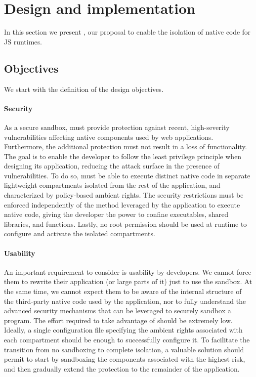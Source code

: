 \section{Design and implementation}
\label{sect:design-and-implementation}

In this section we present \natisand, our proposal to enable the isolation
of native code for JS runtimes.

\subsection{Objectives}
\label{subsect:objectives}

We start with the definition of the design objectives.

\paragraph{Security}
As a secure sandbox, \natisand must provide protection against recent,
high-severity vulnerabilities affecting native components used by web
applications. Furthermore, the additional protection must not result
in a loss of functionality. The goal is to enable the developer to
follow the least privilege principle when designing its application,
reducing the attack surface in the presence of vulnerabilities.  To do
so, \natisand must be able to execute distinct native code in separate lightweight
compartments isolated from the rest of the application, and
characterized by policy-based ambient rights. The security
restrictions must be enforced independently of the method leveraged by
the application to execute native code, giving the developer the power
to confine executables, shared libraries, and functions. Lastly, no
root permission should be used at runtime to configure and activate
the isolated compartments.

\paragraph{Usability}
An important requirement to consider is usability by developers.  We
cannot force them to rewrite their application (or large parts of it)
just to use the sandbox. At the same time, we cannot expect them to be
aware of the internal structure of the third-party native code used by
the application, nor to fully understand the advanced security
mechanisms that can be leveraged to securely sandbox a program. The
effort required to take advantage of \natisand should be extremely
low. Ideally, a single configuration file specifying the ambient
rights associated with each compartment should be enough to
successfully configure it. To facilitate the transition from no
sandboxing to complete isolation, a valuable solution should permit to
start by sandboxing the components associated with the highest risk,
and then gradually extend the protection to the remainder of the
application.

